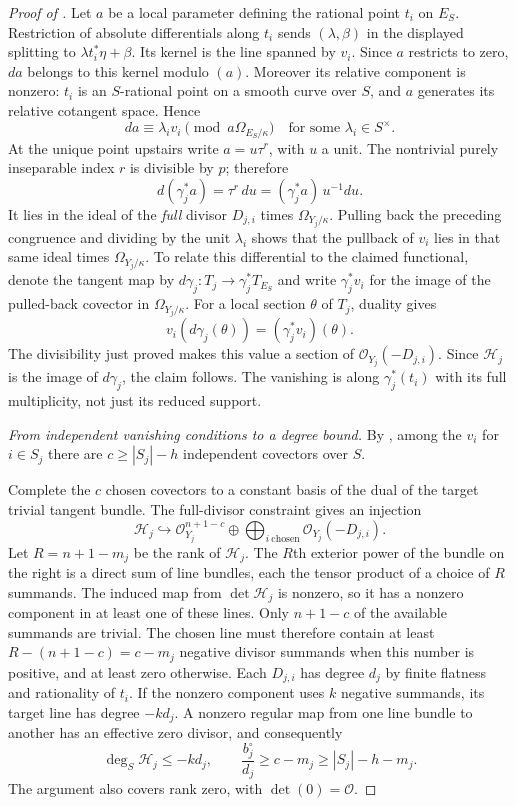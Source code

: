 \begin{proof}[Proof of ]
Let $a$ be a local parameter defining the rational point $t_i$ on
$E_S$.  Restriction of absolute differentials along $t_i$ sends
$(\lambda,\beta)$ in the displayed splitting to
$\lambda t_i^*\eta+\beta$.  Its kernel is the line spanned by $v_i$.
Since $a$ restricts to zero, $da$ belongs to this kernel modulo $(a)$.
Moreover its relative component is nonzero: $t_i$ is an $S$-rational
point on a smooth curve over $S$, and $a$ generates its relative
cotangent space.  Hence
\[
 da\equiv\lambda_i v_i\pmod{a\Omega_{E_S/\kappa}}
 \quad\text{for some }\lambda_i\in S^\times.
\]
At the unique point upstairs write $a=u\tau^r$, with $u$ a unit.
The nontrivial purely inseparable index $r$ is divisible by $p$;
therefore
\[
 d(\gamma_j^*a)=\tau^r\,du=(\gamma_j^*a)\,u^{-1}du.
\]
It lies in the ideal of the \emph{full} divisor $D_{j,i}$ times
$\Omega_{Y_j/\kappa}$.  Pulling back the preceding congruence and
dividing by the unit $\lambda_i$ shows that the pullback of $v_i$ lies
in that same ideal times $\Omega_{Y_j/\kappa}$.
To relate this differential to the claimed functional, denote the
tangent map by $d\gamma_j:T_j\to\gamma_j^*T_{E_S}$ and write
$\gamma_j^*v_i$ for the image of the pulled-back covector in
$\Omega_{Y_j/\kappa}$. For a local section $\theta$ of $T_j$, duality
gives
\[
 v_i(d\gamma_j(\theta))=(\gamma_j^*v_i)(\theta).
\]
The divisibility just proved makes this value a section of
$\mathcal O_{Y_j}(-D_{j,i})$. Since $\mathcal H_j$ is the image of
$d\gamma_j$, the claim follows. The vanishing is along
$\gamma_j^*(t_i)$ with its full multiplicity, not just its reduced
support.

\textit{From independent vanishing conditions to a degree bound.}
By , among the $v_i$ for $i\in S_j$ there are
$c\ge |S_j|-h$ independent covectors over $S$.

Complete the $c$ chosen covectors to a constant basis of the dual of
the target trivial tangent bundle.  The full-divisor constraint gives
an injection
\begin{equation}
 \mathcal H_j\hookrightarrow
 \mathcal O_{Y_j}^{n+1-c}\oplus
       \bigoplus_{i\ \mathrm{chosen}}\mathcal O_{Y_j}(-D_{j,i}).
 \label{eq:label-image-injection}
\end{equation}
Let $R=n+1-m_j$ be the rank of $\mathcal H_j$.
The $R$th exterior power of the bundle on the right is a direct sum
of line bundles, each the tensor product of a choice of $R$ summands.
The induced
map from $\det\mathcal H_j$ is nonzero, so it has a nonzero component
in at least one of these lines. Only $n+1-c$ of the available
summands are trivial. The chosen line must therefore contain at least
$R-(n+1-c)=c-m_j$ negative divisor summands when this number is
positive, and at least zero otherwise.
Each $D_{j,i}$ has degree $d_j$ by finite flatness and rationality of
$t_i$. If the nonzero component uses $k$ negative summands, its target
line has degree $-kd_j$.  A nonzero regular map from one line bundle
to another has an effective zero divisor, and consequently
\[
 \deg_S\mathcal H_j\le-kd_j,
 \qquad
 \frac{b_j^\circ}{d_j}\ge c-m_j\ge |S_j|-h-m_j.
\]
The argument also covers rank zero, with $\det(0)=\mathcal O$.


\end{proof}
